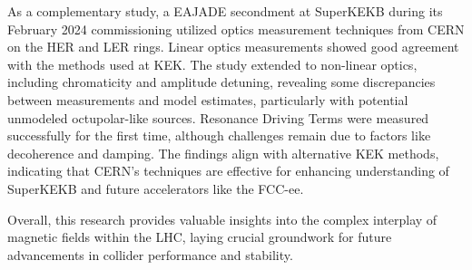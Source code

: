 As a complementary study, a EAJADE secondment at SuperKEKB during its February 2024 commissioning
utilized optics measurement techniques from CERN on the HER and LER rings. Linear optics
measurements showed good agreement with the methods used at KEK.
The study extended to non-linear optics, including chromaticity and amplitude detuning, revealing
some discrepancies between measurements and model estimates, particularly with potential
unmodeled octupolar-like sources. Resonance Driving Terms were measured successfully for the
first time, although challenges remain due to factors like decoherence and damping. The
findings align with alternative KEK methods, indicating that CERN's techniques are effective for
enhancing understanding of SuperKEKB and future accelerators like the FCC-ee.

Overall, this research provides valuable insights into the complex interplay of magnetic fields
within the LHC, laying crucial groundwork for future advancements in collider performance and
stability.
